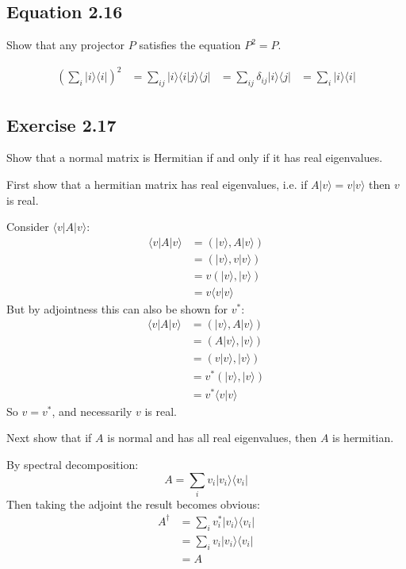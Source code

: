 \documentclass[]{article}
\begin{document}
\subsection{Equation 2.16}

Show that any projector $P$ satisfies the equation $P^2 = P$.

\begin{align*}
(\sum_i |i\rangle\langle i|)^2
&= \sum_{ij} |i\rangle\langle i|j\rangle\langle j|
&= \sum_{ij} \delta_{ij}|i\rangle\langle j|
&= \sum_i |i\rangle\langle i|
\end{align*}

\subsection{Exercise 2.17}
Show that a normal matrix is Hermitian if and only if it has real eigenvalues.

First show that a hermitian matrix has real eigenvalues, i.e. if $A|v\rangle = v|v\rangle$ then $v$ is real.

Consider $\langle v|A|v\rangle$:
\begin{align*}
\langle v|A|v\rangle
&= (|v\rangle, A|v\rangle) \\
&= (|v\rangle, v|v\rangle) \\
&= v(|v\rangle, |v\rangle) \\
&= v\langle v|v\rangle
\end{align*}
But by adjointness this can also be shown for $v^*$:
\begin{align*}
\langle v|A|v\rangle
&= (|v\rangle, A|v\rangle) \\
&= (A|v\rangle, |v\rangle) \\
&= (v|v\rangle, |v\rangle) \\
&= v^*(|v\rangle, |v\rangle) \\
&= v^*\langle v|v\rangle
\end{align*}
So $v = v^*$, and necessarily $v$ is real.

Next show that if $A$ is normal and has all real eigenvalues, then $A$ is hermitian.

By spectral decomposition:
\[A = \sum_i v_i|v_i\rangle\langle v_i|\]
Then taking the adjoint the result becomes obvious:
\begin{align*}
A^\dagger
&= \sum_i v_i^* |v_i\rangle\langle v_i| \\
&= \sum_i v_i |v_i\rangle\langle v_i| \\
&= A
\end{align*}
\end{document}
